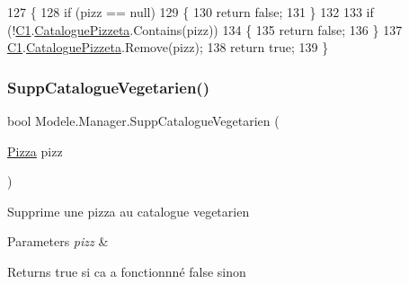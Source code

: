 \begin{DoxyCode}
127         \{
128             \textcolor{keywordflow}{if} (pizz == null)
129             \{
130                 \textcolor{keywordflow}{return} \textcolor{keyword}{false};
131             \}
132 
133             \textcolor{keywordflow}{if} (!\hyperlink{classModele_1_1Manager_a54bbc7bd646fcaa0f1a590310dd3c02c}{C1}.\hyperlink{classModele_1_1Catalogue_ac5490e1026b5b08d43e30b68da893423}{CataloguePizzeta}.Contains(pizz))
134             \{
135                 \textcolor{keywordflow}{return} \textcolor{keyword}{false};
136             \}
137             \hyperlink{classModele_1_1Manager_a54bbc7bd646fcaa0f1a590310dd3c02c}{C1}.\hyperlink{classModele_1_1Catalogue_ac5490e1026b5b08d43e30b68da893423}{CataloguePizzeta}.Remove(pizz);
138             \textcolor{keywordflow}{return} \textcolor{keyword}{true};
139         \}
\end{DoxyCode}
\mbox{\label{classModele_1_1Manager_a9f7374e98fcff11bea2dc069f2623e41}} 
\subsubsection{\texorpdfstring{Supp\+Catalogue\+Vegetarien()}{SuppCatalogueVegetarien()}}
{\footnotesize\ttfamily bool Modele.\+Manager.\+Supp\+Catalogue\+Vegetarien (\begin{DoxyParamCaption}\item[{\hyperlink{classModele_1_1Pizza}{Pizza}}]{pizz }\end{DoxyParamCaption})\hspace{0.3cm}{\ttfamily [inline]}}



Supprime une pizza au catalogue vegetarien 


\begin{DoxyParams}{Parameters}
{\em pizz} & \\
\hline
\end{DoxyParams}
\begin{DoxyReturn}{Returns}
true si ca a fonctionnné false sinon
\end{DoxyReturn}

